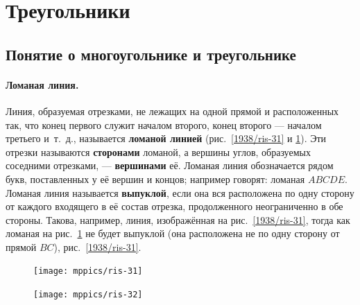 \section{Треугольники}

\subsection*{Понятие о многоугольнике и треугольнике}

\paragraph{Ломаная линия.}\label{1938/33}
Линия, образуемая отрезками, не лежащих на одной прямой и расположенных так, что конец первого служит началом второго, конец второго — началом третьего и~т.~д., называется \textbf{ломаной линией} (рис.~\ref{1938/ris-31} и \ref{1938/ris-32}).
Эти отрезки называются \textbf{сторонами} ломаной, а вершины углов, образуемых соседними отрезками, — \textbf{вершинами} её.
Ломаная линия обозначается рядом букв, поставленных у её вершин и концов;
например говорят:
ломаная $ABCDE$.
Ломаная линия называется \textbf{выпуклой}, если она вся расположена по одну сторону от каждого входящего в её состав отрезка, продолженного неограниченно в обе стороны.
Такова, например, линия, изображённая на рис.~\ref{1938/ris-31}, тогда как ломаная на рис.~\ref{1938/ris-32} не будет выпуклой (она расположена не по одну сторону от прямой $BC$), рис.~\ref{1938/ris-31}.

\begin{figure}[h]
\begin{minipage}{.48\textwidth}
\centering
\texttt{[image: mppics/ris-31]}
\end{minipage}\hfill
\begin{minipage}{.48\textwidth}
\centering
\texttt{[image: mppics/ris-32]}
\end{minipage}

\medskip

\begin{minipage}{.48\textwidth}
\centering
\caption{}\label{1938/ris-31}
\end{minipage}\hfill
\begin{minipage}{.48\textwidth}
\centering
\caption{}\label{1938/ris-32}
\end{minipage}
\vskip-4mm
\end{figure}

